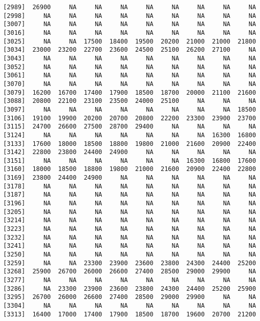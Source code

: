 \documentclass[]{article}
\begin{document}
\begin{verbatim}
 [2989]  26900     NA     NA     NA     NA     NA     NA     NA     NA
 [2998]     NA     NA     NA     NA     NA     NA     NA     NA     NA
 [3007]     NA     NA     NA     NA     NA     NA     NA     NA     NA
 [3016]     NA     NA     NA     NA     NA     NA     NA     NA     NA
 [3025]     NA     NA  17500  18400  19500  20200  21000  21000  21800
 [3034]  23000  23200  22700  23600  24500  25100  26200  27100     NA
 [3043]     NA     NA     NA     NA     NA     NA     NA     NA     NA
 [3052]     NA     NA     NA     NA     NA     NA     NA     NA     NA
 [3061]     NA     NA     NA     NA     NA     NA     NA     NA     NA
 [3070]     NA     NA     NA     NA     NA     NA     NA     NA     NA
 [3079]  16200  16700  17400  17900  18500  18700  20000  21100  21600
 [3088]  20800  22100  23100  23500  24000  25100     NA     NA     NA
 [3097]     NA     NA     NA     NA     NA     NA     NA     NA  18500
 [3106]  19100  19900  20200  20700  20800  22200  23300  23900  23700
 [3115]  24700  26600  27500  28700  29400     NA     NA     NA     NA
 [3124]     NA     NA     NA     NA     NA     NA     NA  16300  16800
 [3133]  17600  18000  18500  18800  19800  21000  21600  20900  22400
 [3142]  22800  23800  24400  24900     NA     NA     NA     NA     NA
 [3151]     NA     NA     NA     NA     NA     NA  16300  16800  17600
 [3160]  18000  18500  18800  19800  21000  21600  20900  22400  22800
 [3169]  23800  24400  24900     NA     NA     NA     NA     NA     NA
 [3178]     NA     NA     NA     NA     NA     NA     NA     NA     NA
 [3187]     NA     NA     NA     NA     NA     NA     NA     NA     NA
 [3196]     NA     NA     NA     NA     NA     NA     NA     NA     NA
 [3205]     NA     NA     NA     NA     NA     NA     NA     NA     NA
 [3214]     NA     NA     NA     NA     NA     NA     NA     NA     NA
 [3223]     NA     NA     NA     NA     NA     NA     NA     NA     NA
 [3232]     NA     NA     NA     NA     NA     NA     NA     NA     NA
 [3241]     NA     NA     NA     NA     NA     NA     NA     NA     NA
 [3250]     NA     NA     NA     NA     NA     NA     NA     NA     NA
 [3259]     NA     NA  23300  23900  23600  23800  24300  24400  25200
 [3268]  25900  26700  26000  26600  27400  28500  29000  29900     NA
 [3277]     NA     NA     NA     NA     NA     NA     NA     NA     NA
 [3286]     NA  23300  23900  23600  23800  24300  24400  25200  25900
 [3295]  26700  26000  26600  27400  28500  29000  29900     NA     NA
 [3304]     NA     NA     NA     NA     NA     NA     NA     NA     NA
 [3313]  16400  17000  17400  17900  18500  18700  19600  20700  21200

\end{verbatim}
\end{document}

